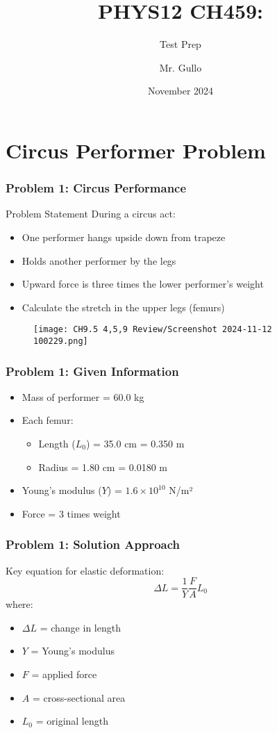 \documentclass{beamer}
\title[Unit 2 Review]{PHYS12 CH459:}
\subtitle{Test Prep}
\author[Mr. Gullo]{Mr. Gullo}
\date[Nov 2024]{November 2024}
\begin{document}
\frame{\titlepage}


\section{Circus Performer Problem}

\begin{frame}
\frametitle{Problem 1: Circus Performance}
\begin{block}{Problem Statement}
During a circus act:
\begin{itemize}
    \item One performer hangs upside down from trapeze
    \item Holds another performer by the legs
    \item Upward force is three times the lower performer's weight
    \item Calculate the stretch in the upper legs (femurs)
\end{itemize}
\end{block}
\begin{figure}
    \centering
    \texttt{[image: CH9.5 4,5,9 Review/Screenshot 2024-11-12 100229.png]}
\end{figure}

\end{frame}

\begin{frame}
\frametitle{Problem 1: Given Information}
\begin{itemize}
    \item Mass of performer = 60.0 kg
    \item Each femur:
    \begin{itemize}
        \item Length ($L_0$) = 35.0 cm = 0.350 m
        \item Radius = 1.80 cm = 0.0180 m
    \end{itemize}
    \item Young's modulus ($Y$) = $1.6 \times 10^{10}$ N/m²
    \item Force = 3 times weight
\end{itemize}
\end{frame}

\begin{frame}
\frametitle{Problem 1: Solution Approach}
Key equation for elastic deformation:
$$\Delta L = \frac{1}{Y} \frac{F}{A} L_0$$
where:
\begin{itemize}
    \item $\Delta L$ = change in length
    \item $Y$ = Young's modulus
    \item $F$ = applied force
    \item $A$ = cross-sectional area
    \item $L_0$ = original length
\end{itemize}
\end{frame}
\end{document}
